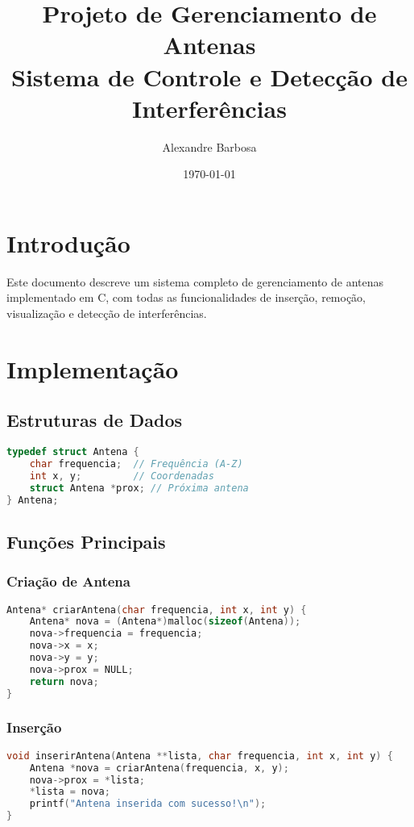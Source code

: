 \documentclass[a4paper, 12pt]{report}
\title{
    \vspace{2cm}
    \textbf{Projeto de Gerenciamento de Antenas}\\
    \large Sistema de Controle e Detecção de Interferências
}
\author{
    Alexandre Barbosa\\
}
\date{\today}
\begin{document}
\maketitle
\tableofcontents
\lstlistoflistings

\chapter{Introdução}
Este documento descreve um sistema completo de gerenciamento de antenas implementado em C, com todas as funcionalidades de inserção, remoção, visualização e detecção de interferências.

\chapter{Implementação}
\section{Estruturas de Dados}
\begin{lstlisting}[language=C, caption=Definição da estrutura Antena]
typedef struct Antena {
    char frequencia;  // Frequência (A-Z)
    int x, y;         // Coordenadas
    struct Antena *prox; // Próxima antena
} Antena;
\end{lstlisting}

\section{Funções Principais}

\subsection{Criação de Antena}
\begin{lstlisting}[language=C, caption=Função criarAntena]
Antena* criarAntena(char frequencia, int x, int y) {
    Antena* nova = (Antena*)malloc(sizeof(Antena));
    nova->frequencia = frequencia;
    nova->x = x;
    nova->y = y;
    nova->prox = NULL;
    return nova;
}
\end{lstlisting}

\subsection{Inserção}
\begin{lstlisting}[language=C, caption=Função inserirAntena]
void inserirAntena(Antena **lista, char frequencia, int x, int y) {
    Antena *nova = criarAntena(frequencia, x, y);
    nova->prox = *lista;
    *lista = nova;
    printf("Antena inserida com sucesso!\n");
}
\end{lstlisting}
\end{document}

